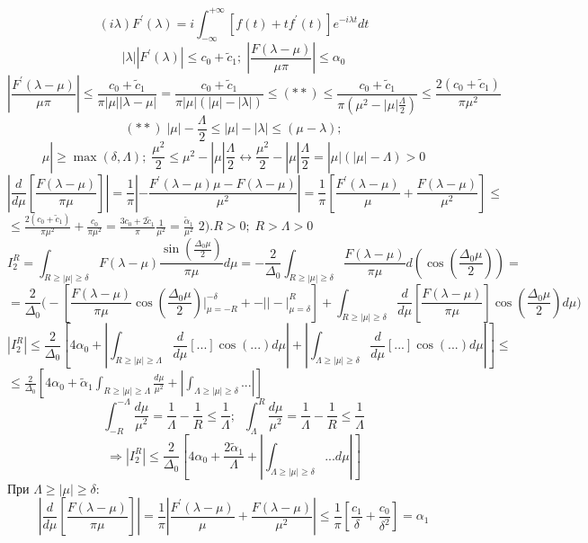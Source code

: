 \[(i\lambda)F^{'}(\lambda) = i\int_{-\infty}^{+\infty} [f(t) + tf^{'}(t)]e^{-i\lambda t}dt\]
\[|\lambda||F^{'}(\lambda)| \leq c_0 + \widetilde{c}_1; \; |\frac{F(\lambda - \mu)}{\mu\pi}| \leq \alpha_0\]
\[|\frac{F^{'}(\lambda - \mu)}{\mu\pi}| \leq \frac{c_0 + \widetilde{c}_1}{\pi|\mu||\lambda - \mu|} = \frac{c_0 + \widetilde{c}_1}{\pi|\mu|(|\mu| - |\lambda|)} \leq {(**)} \leq \frac{c_0 + \widetilde{c}_1}{\pi(\mu^2 - |\mu|\frac{\Lambda}{2})} \leq \frac{2(c_0 + \widetilde{c}_1)}{\pi\mu^2}\]
\[(**) \; |\mu| - \frac{\Lambda}{2} \leq |\mu| - |\lambda| \leq (\mu - \lambda);\]
\[\mu| \geq \max(\delta, \Lambda);\; \frac{\mu^2}{2} \leq \mu^2 - |\mu|\frac{\Lambda}{2} \leftrightarrow \frac{\mu^2}{2} - |\mu|\frac{\Lambda}{2} = |\mu|(|\mu| - \Lambda) > 0\]
\[|\frac{d}{d\mu}[\frac{F(\lambda - \mu)}{\pi\mu}]| = \frac{1}{\pi}|-\frac{F^{'}(\lambda - \mu)\mu - F(\lambda - \mu)}{\mu^2}| = \frac{1}{\pi}[\frac{F^{'}(\lambda - \mu)}{\mu} + \frac{F(\lambda - \mu)}{\mu^2}] \leq\]
\(\leq \frac{2(c_0 + \widetilde{c}_1)}{\pi\mu^2} + \frac{c_0}{\pi\mu^2} = \frac{3c_0 + 2\widetilde{c}_1}{\pi}\frac{1}{\mu^2} = \frac{\widetilde{\alpha}_1}{\mu^2}\)
\(2).R > 0;\; R > \Lambda > 0\)
\[I_2^R = \int_{R \geq |\mu| \geq \delta} F(\lambda - \mu)\frac{\sin(\frac{\Delta_0\mu}{2})}{\pi\mu}d\mu = -\frac{2}{\Delta_0}\int_{R \geq |\mu| \geq \delta} \frac{F(\lambda - \mu)}{\pi\mu}d(\cos(\frac{\Delta_0\mu}{2})) = \]
\[= \frac{2}{\Delta_0}\Big(-[\frac{F(\lambda - \mu)}{\pi\mu}\cos(\frac{\Delta_0\mu}{2})\bigg|_{\mu = -R}^{-\delta} + -||-\bigg|_{\mu = \delta}^R] + \int_{R \geq |\mu| \geq \delta} \frac{d}{d\mu}[\frac{F(\lambda - \mu)}{\pi\mu}]\cos(\frac{\Delta_0\mu}{2})d\mu\Big)\]
\[|I_2^R| \leq \frac{2}{\Delta_0}[4\alpha_0 + |\int_{R \geq |\mu| \geq \Lambda} \frac{d}{d\mu}[...]\cos(...)d\mu| + |\int_{\Lambda \geq |\mu| \geq \delta} \frac{d}{d\mu}[...]\cos(...)d\mu|] \leq \]
\(\leq \frac{2}{\Delta_0}[4\alpha_0 + \widetilde{\alpha}_1\int_{R \geq |\mu| \geq \Lambda} \frac{d\mu}{\mu^2} + |\int_{\Lambda \geq |\mu| \geq \delta} ...|]\)
\[\int_{-R}^{-\Lambda} \frac{d\mu}{\mu^2} = \frac{1}{\Lambda} - \frac{1}{R} \leq \frac{1}{\Lambda};\;\; \int_{\Lambda}^{R} \frac{d\mu}{\mu^2} = \frac{1}{\Lambda} - \frac{1}{R} \leq \frac{1}{\Lambda}\]
\[\Rightarrow |I_2^R| \leq \frac{2}{\Delta_0}[4\alpha_0 + \frac{2\widetilde{\alpha}_1}{\Lambda} + |\int_{\Lambda \geq |\mu| \geq \delta} ...d\mu|]\]
При $\Lambda \geq |\mu| \geq \delta:$
\[|\frac{d}{d\mu}[\frac{F(\lambda - \mu)}{\pi\mu}]| = \frac{1}{\pi}|\frac{F^{'}(\lambda - \mu)}{\mu} + \frac{F(\lambda - \mu)}{\mu^2}| \leq \frac{1}{\pi}[\frac{c_1}{\delta} + \frac{c_0}{\delta^2}] = \alpha_1\]
